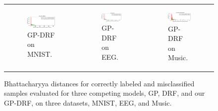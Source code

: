 \documentclass[conference]{IEEEtran}
\begin{document}
\begin{figure}[t]
\begin{tabular}{lll}
\begin{subfigure}[b]{0.31\textwidth}
\includegraphics[scale=0.445]{figs_pdf/GP_DRF_MNIST.pdf}
\caption{GP-DRF on MNIST.}
\end{subfigure}
&
\begin{subfigure}[b]{0.31\textwidth}
\includegraphics[scale=0.445]{figs_pdf/GP_DRF_EEG.pdf}
\caption{GP-DRF on EEG.}
\end{subfigure}
&
\begin{subfigure}[b]{0.31\textwidth}
\includegraphics[scale=0.445]{figs_pdf/GP_DRF_Double_Music.pdf}
\caption{GP-DRF on Music.}
\end{subfigure}

\end{tabular}

\caption{Bhattacharyya distances for correctly labeled and misclassified samples evaluated for three competing models, GP, DRF, and our GP-DRF, on three datasets, MNIST, EEG, and Music. }
\label{fig:Bhattacharyya}
\end{figure}
\end{document}

